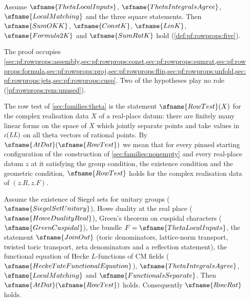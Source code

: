 \begin{theorem}\label{pf:rowprops:rowthm}
Assume $\sfname{ThetaLocalInputs}$, $\sfname{ThetaIntegralsAgree}$, $\sfname{LocalMatching}$ and the three square
statements. Then $\sfname{SumOKK}$, $\sfname{ConstK}$, $\sfname{LinK}$, $\sfname{Formula2K}$ and $\sfname{SumRatK}$ hold
(\cref{def:pf:rowprops:five}).
\end{theorem}

The proof occupies \cref{sec:pf:rowprops:assembly,sec:pf:rowprops:const,sec:pf:rowprops:sumrat,sec:pf:rowprops:formula,sec:pf:rowprops:proj,sec:pf:rowprops:flip,sec:pf:rowprops:unfold,sec:pf:rowprops:jets,sec:pf:rowprops:cusp}.
Two of the hypotheses play no role (\cref{pf:rowprops:rem:unused}).

\begin{definition}\label{def:pf:rowprops:atdat}
The row test of \cref{sec:families:theta} is the statement $\sfname{RowTest}(X)$ for the complex realisation data $X$
of a real-place datum: there are finitely many linear forms on the space of $X$ which jointly separate points and take
values in $\iota(\mathit{LL})$ on all theta vectors of rational points. By $\sfname{AtDat}(\sfname{RowTest})$ we mean
that for every pinned starting configuration of the construction of \cref{sec:families:nonempty} and every real-place
datum $z$ at it satisfying the group condition, the existence condition and the geometric condition, $\sfname{RowTest}$
holds for the complex realisation data of $(z.R,z.F)$.
\end{definition}

\begin{theorem}\label{pf:rowprops:main}
Assume the existence of Siegel sets for unitary groups ($\sfname{SiegelSetUnitary}$), Howe duality at the real place
($\sfname{HoweDualityReal}$), Green's theorem on cuspidal characters ($\sfname{GreenCuspidal}$), the bundle
$F=\sfname{ThetaLocalInputs}$, the statement $\sfname{JoinOut}$ (toric denominators, lattice-norm transport, twisted
toric transport, zeta denominators and a reflection statement), the functional equation of Hecke $L$-functions of CM
fields ($\sfname{HeckeTateFunctionalEquation}$), $\sfname{ThetaIntegralsAgree}$, $\sfname{LocalMatching}$ and
$\sfname{FunctionalsSeparate}$. Then $\sfname{AtDat}(\sfname{RowTest})$ holds. Consequently $\sfname{RowRat}$ holds.
\end{theorem}

